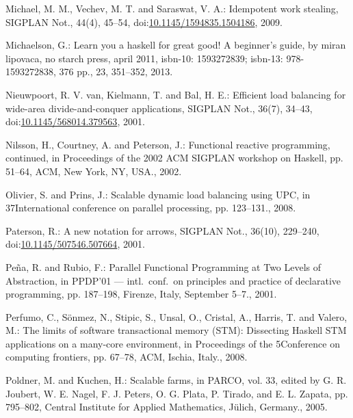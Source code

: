 \documentclass[paper=A4,twoside=true,openright,parskip=full,chapterprefix=true,headings=normal,bibliography=totoc,listof=totoc,titlepage=on,captions=tableabove,draft=false,british]{scrreprt}%
\begin{document}
\leavevmode\hypertarget{ref-Michael:2009:IWS:1594835.1504186}{}%
Michael, M. M., Vechev, M. T. and Saraswat, V. A.: Idempotent work
stealing, SIGPLAN Not., 44(4), 45--54,
doi:\href{https://doi.org/10.1145/1594835.1504186}{10.1145/1594835.1504186},
2009.

\leavevmode\hypertarget{ref-learnyouahaskell}{}%
Michaelson, G.: Learn you a haskell for great good! A beginner's guide,
by miran lipovaca, no starch press, april 2011, isbn-10: 1593272839;
isbn-13: 978-1593272838, 376 pp., 23, 351--352, 2013.

\leavevmode\hypertarget{ref-vanNieuwpoort:2001:ELB:568014.379563}{}%
Nieuwpoort, R. V. van, Kielmann, T. and Bal, H. E.: Efficient load
balancing for wide-area divide-and-conquer applications, SIGPLAN Not.,
36(7), 34--43,\linebreak
doi:\href{https://doi.org/10.1145/568014.379563}{10.1145/568014.379563},
2001.

\leavevmode\hypertarget{ref-Nilsson:2002:FRP:581690.581695}{}%
Nilsson, H., Courtney, A. and Peterson, J.: Functional reactive
programming, continued, in Proceedings of the 2002 ACM SIGPLAN workshop
on Haskell, pp. 51--64, ACM, New York, NY, USA., 2002.

\leavevmode\hypertarget{ref-4625841}{}%
Olivier, S. and Prins, J.: Scalable dynamic load balancing using UPC, in
37International conference on parallel processing, pp. 123--131., 2008.

\leavevmode\hypertarget{ref-Paterson:2001:NNA:507669.507664}{}%
Paterson, R.: A new notation for arrows, SIGPLAN Not., 36(10), 229--240,\linebreak
doi:\href{https://doi.org/10.1145/507546.507664}{10.1145/507546.507664},
2001.

\leavevmode\hypertarget{ref-Eden:PPDP01}{}%
Peña, R. and Rubio, F.: Parallel Functional Programming at Two Levels of
Abstraction, in PPDP'01 --- intl.~conf.~on principles and practice of
declarative programming, pp. 187--198, Firenze, Italy, September 5--7.,
2001.

\leavevmode\hypertarget{ref-Perfumo:2008:LST:1366230.1366241}{}%
Perfumo, C., Sönmez, N., Stipic, S., Unsal, O., Cristal, A., Harris, T.
and Valero, M.: The limits of software transactional memory (STM):
Dissecting Haskell STM applications on a many-core environment, in
Proceedings of the 5Conference on computing frontiers, pp. 67--78, ACM,
Ischia, Italy., 2008.

\leavevmode\hypertarget{ref-Kuchen05}{}%
Poldner, M. and Kuchen, H.: Scalable farms, in PARCO, vol. 33, edited by
G. R. Joubert, W. E. Nagel, F. J. Peters, O. G. Plata, P. Tirado, and E.
L. Zapata, pp. 795--802, Central Institute for Applied Mathematics,
Jülich, Germany., 2005.
\end{document}
